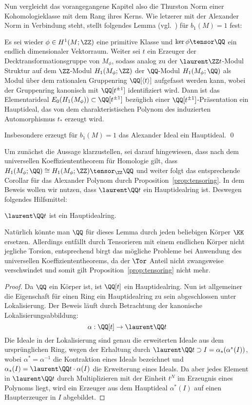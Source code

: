 Nun vergleicht das vorangegangene Kapitel also die Thurston Norm einer Kohomologieklasse mit dem Rang ihres Kerns. Wie letzerer mit der Alexander Norm in Verbindung steht, stellt folgendes Lemma (vgl.~\cite[Assertion~4]{Milnor.2009}) für $b_1(M)=1$ fest:
\begin{lem}
	\label{lem:charPol}
	Es sei wieder $\phi \in H^1(M;\ZZ)$ eine primitive Klasse und $\ker \phi \tensor \QQ$ ein endlich dimensionaler Vektorraum. Weiter sei $t$ ein Erzeuger der Decktransformationsgruppe von $M_\phi$, sodass analog zu der $\laurent \ZZ t$-Modul Struktur auf dem $\ZZ$-Modul $H_1(M_\phi;\ZZ)$ der $\QQ$-Modul $H_1(M_\phi;\QQ)$ als Modul über dem rationalen Gruppenring $\QQ[\langle t \rangle]$ aufgefasst werden kann, wobei der Gruppenring kanonisch mit $\QQ[t^{\pm 1}]$ identifiziert wird. Dann ist das Elementarideal $E_0(H_1(M_\phi))\subset \QQ[t^{\pm1}]$ bezüglich einer $\QQ[t^{\pm 1}]$-Präsentation ein Hauptideal, das von dem charakteristischen Polynom des induzierten Automorphismus $t_*$ erzeugt wird.
\end{lem}
\begin{cor}
	Insbesondere erzeugt für $b_1(M)=1$ das Alexander Ideal ein Hauptideal. \qed
\end{cor}
Um zunächst die Aussage klarzustellen, sei darauf hingewiesen, dass nach dem universellen Koeffiziententheorem für Homologie gilt, dass $H_1(M_\phi;\QQ) \cong H_1(M_\phi;\ZZ)\tensor_\ZZ \QQ$ und weiter folgt das entsprechende Corollar für das Alexander Polynom durch Proposition~\ref{prop:tensoring}.
In dem Beweis wollen wir nutzen, dass $\laurent\QQ t$ ein Hauptidealring ist. Deswegen folgendes Hilfsmittel:
\begin{lem}
\label{lem:QThauptidealring}
	$\laurent\QQ t$ ist ein Hauptidealring.
\end{lem}
Natürlich könnte man $\QQ$ für dieses Lemma durch jeden beliebigen Körper $\KK$ ersetzen. Allerdings entfällt durch Tensorieren mit einem endlichen Körper nicht jegliche Torsion, entsprechend birgt das mögliche Probleme bei Anwendung des universellen Koeffiziententheorems, da der $\Tor$ Anteil nicht zwangsweise verschwindet und somit gilt Proposition~\ref{prop:tensoring} nicht mehr.
\begin{proof}
	Da $\QQ$ ein Körper ist, ist $\QQ[t]$ ein Hauptidealring. Nun ist allgemeiner die Eigenschaft für einen Ring ein Hauptidealring zu sein abgeschlossen unter Lokalisierung. Der Beweis läuft durch Betrachtung der kanonische Lokalisierungsabbildung:
	\[
		\alpha : \QQ[t] \to \laurent \QQ t
	\]
	Die Ideale in der Lokalisierung sind genau die erweiterten Ideale aus dem ursprünglichen Ring, wegen der Erhaltung durch $\laurent \QQ t \supset I=\alpha_*(\alpha^*(I))$, wobei $\alpha^* = \alpha^{-1}$ die Kontraktion eines Ideals bezeichnet und $\alpha_*(I) = \laurent \QQ t \cdot \alpha(I)$ die Erweiterung eines Ideals. Da aber jedes Element in $\laurent \QQ t$ durch Multiplizieren mit der Einheit $t^N$ im Erzeugnis eines Polynoms liegt, wird ein Erzeuger aus dem Hauptideal $\alpha^*(I)$ auf einen Haupterzeuger in $I$ abgebildet. 
\end{proof}
